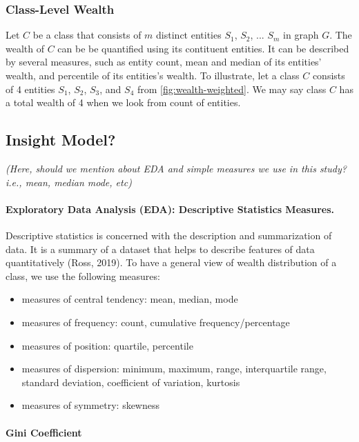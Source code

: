 \documentclass[
]{ceurart}
\begin{document}
\subsubsection{Class-Level Wealth}
Let \(C\) be a class that consists of \(m\) distinct entities \(S_1\), \(S_2\), ... \(S_m\) in graph \(G\). The wealth of \(C\) can be be quantified using its contituent entities. It can be described by several measures, such as entity count, mean and median of its entities' wealth, and percentile of its entities's wealth. To illustrate, let a class \(C\) consists of 4 entities  \(S_1\), \(S_2\), \(S_3\), and \(S_4\) from \autoref{fig:wealth-weighted}. We may say class \(C\) has a total wealth of 4 when we look from count of entities.


\subsection{Insight Model?}

\textit{(Here, should we mention about EDA and simple measures we use in this study? i.e., mean, median mode, etc)}

\paragraph{Exploratory Data Analysis (EDA): Descriptive Statistics Measures.} Descriptive statistics is concerned with the description and summarization of data. It is a summary of a dataset that helps to describe features of data quantitatively (Ross, 2019). To have a general view of wealth distribution of a class, we use the following measures:
\begin{itemize}
  \item measures of central tendency: mean, median, mode
  \item measures of frequency: count, cumulative frequency/percentage
  \item measures of position: quartile, percentile
  \item measures of dispersion: minimum, maximum, range, interquartile range, standard deviation, coefficient of variation, kurtosis
  \item measures of symmetry: skewness
\end{itemize}


\paragraph{Gini Coefficient}
\end{document}
